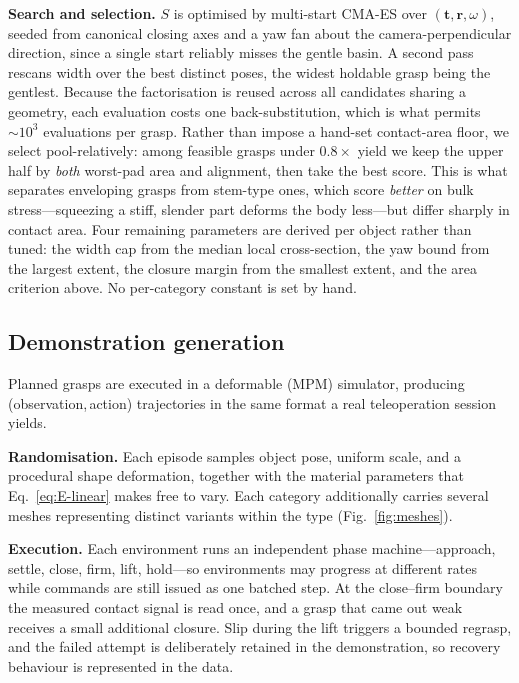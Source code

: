 \noindent\textbf{Search and selection.}
$S$ is optimised by multi-start CMA-ES over $(\mathbf{t},\mathbf{r},\omega)$, seeded from
canonical closing axes and a yaw fan about the camera-perpendicular direction, since a single
start reliably misses the gentle basin. A second pass rescans width over the best distinct
poses, the widest holdable grasp being the gentlest. Because the factorisation is reused across
all candidates sharing a geometry, each evaluation costs one back-substitution, which is what
permits $\sim\!10^3$ evaluations per grasp. Rather than impose a hand-set contact-area floor, we
select pool-relatively: among feasible grasps under $0.8\times$ yield we keep the upper half by
\emph{both} worst-pad area and alignment, then take the best score. This is what separates
enveloping grasps from stem-type ones, which score \emph{better} on bulk stress---squeezing a
stiff, slender part deforms the body less---but differ sharply in contact area. Four remaining
parameters are derived per object rather than tuned: the width cap from the median local
cross-section, the yaw bound from the largest extent, the closure margin from the smallest
extent, and the area criterion above. No per-category constant is set by hand.

\subsection{Demonstration generation}
\label{sec:method:demos}
Planned grasps are executed in a deformable (MPM) simulator, producing
(observation,\,action) trajectories in the same format a real teleoperation session yields.

\noindent\textbf{Randomisation.}
Each episode samples object pose, uniform scale, and a procedural shape deformation, together
with the material parameters that Eq.~\eqref{eq:E-linear} makes free to vary. Each category
additionally carries several meshes representing distinct variants within the type
(Fig.~\ref{fig:meshes}).

\noindent\textbf{Execution.}
Each environment runs an independent phase machine---approach, settle, close, firm, lift,
hold---so environments may progress at different rates while commands are still issued as one
batched step. At the close--firm boundary the measured contact signal is read once, and a grasp
that came out weak receives a small additional closure. Slip during the lift triggers a bounded
regrasp, and the failed attempt is deliberately retained in the demonstration, so recovery
behaviour is represented in the data.

